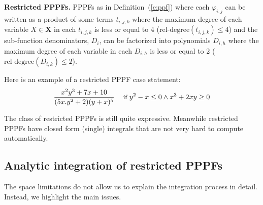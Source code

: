 \documentclass[letterpaper]{article}
\renewcommand{\vec}[1]{\mathbf{#1}}
\newcommand{\bvec}[1]{\textbf{#1}}
\newcommand{\singlecase}[2]{#2 \quad \text{ if } #1}
\begin{document}
\textbf{Restricted PPPFs. }
PPPFs as in Definition~(\ref{e:ppf}) where 
each $\varphi_{i,j}$
can be written as a product of some terms $t_{i,j,k}$ where the maximum degree of each variable $X \in \bvec{X}$ in each $t_{i,j,k}$ is less or equal to 4 ($\text{rel-degree}(t_{i,j,k}) \leq 4$)
and the sub-function denominators, $D_{i}$, can be factorized into polynomials ${D}_{i,h}$ where the maximum degree of each variable in each $D_{i,h}$ is less or equal to 2 ($\text{rel-degree}(D_{i, k}) \leq 2$).%

Here is an example of a restricted PPPF case statement:
\begin{equation*}
{\footnotesize
\singlecase{y^2-x\leq 0 \wedge x^3+2xy \geq 0}{\frac{x^2 y^3 + 7x + 10}{(5x.y^2 + 2)(y + x)^5}}
}
\end{equation*}

The class of restricted PPPFs is still quite expressive. Meanwhile restricted PPPFs have closed form (single) integrals that are not very hard to compute automatically. 

\subsection{Analytic integration of restricted PPPFs}
The space limitations do not allow us to explain the integration process in detail. 
Instead, we highlight the main issues.
\end{document}
